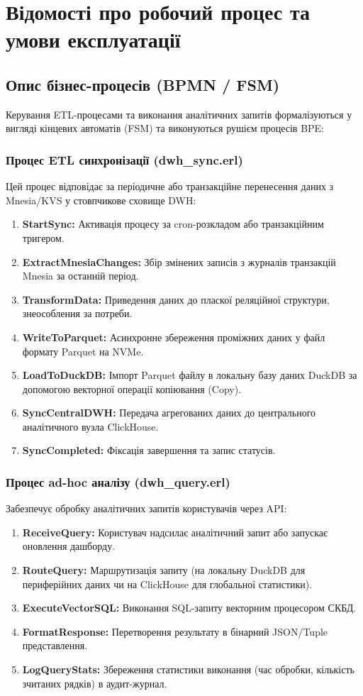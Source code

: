 \documentclass{article}
\begin{document}
\section{Відомості про робочий процес та умови експлуатації}

\subsection{Опис бізнес-процесів (BPMN / FSM)}
Керування ETL-процесами та виконання аналітичних запитів формалізуються у вигляді кінцевих автоматів (FSM) та виконуються рушієм процесів BPE:

\subsubsection{Процес ETL синхронізації (dwh\_sync.erl)}
Цей процес відповідає за періодичне або транзакційне перенесення даних з Mnesia/KVS у стовпчикове сховище DWH:
\begin{enumerate}
    \item \textbf{StartSync:} Активація процесу за cron-розкладом або транзакційним тригером.
    \item \textbf{ExtractMnesiaChanges:} Збір змінених записів з журналів транзакцій Mnesia за останній період.
    \item \textbf{TransformData:} Приведення даних до пласкої реляційної структури, знеособлення за потреби.
    \item \textbf{WriteToParquet:} Асинхронне збереження проміжних даних у файл формату Parquet на NVMe.
    \item \textbf{LoadToDuckDB:} Імпорт Parquet файлу в локальну базу даних DuckDB за допомогою векторної операції копіювання (Copy).
    \item \textbf{SyncCentralDWH:} Передача агрегованих даних до центрального аналітичного вузла ClickHouse.
    \item \textbf{SyncCompleted:} Фіксація завершення та запис статусів.
\end{enumerate}

\subsubsection{Процес ad-hoc аналізу (dwh\_query.erl)}
Забезпечує обробку аналітичних запитів користувачів через API:
\begin{enumerate}
    \item \textbf{ReceiveQuery:} Користувач надсилає аналітичний запит або запускає оновлення дашборду.
    \item \textbf{RouteQuery:} Маршрутизація запиту (на локальну DuckDB для периферійних даних чи на ClickHouse для глобальної статистики).
    \item \textbf{ExecuteVectorSQL:} Виконання SQL-запиту векторним процесором СКБД.
    \item \textbf{FormatResponse:} Перетворення результату в бінарний JSON/Tuple представлення.
    \item \textbf{LogQueryStats:} Збереження статистики виконання (час обробки, кількість зчитаних рядків) в аудит-журнал.
\end{enumerate}
\end{document}
